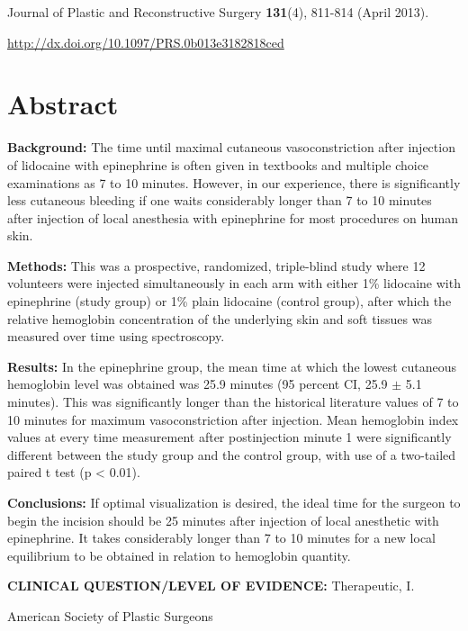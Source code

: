 \noindent Journal of Plastic and Reconstructive Surgery \textbf{131}(4), 811-814 (April 2013).

\noindent \url{http://dx.doi.org/10.1097/PRS.0b013e3182818ced}

\section*{Abstract}

\textbf{Background:} The time until maximal cutaneous vasoconstriction after injection of lidocaine with epinephrine is often given in textbooks and multiple choice examinations as 7 to 10 minutes. However, in our experience, there is significantly less cutaneous bleeding if one waits considerably longer than 7 to 10 minutes after injection of local anesthesia with epinephrine for most procedures on human skin.

\textbf{Methods:} This was a prospective, randomized, triple-blind study where 12 volunteers were injected simultaneously in each arm with either 1\% lidocaine with epinephrine (study group) or 1\% plain lidocaine (control group), after which the relative hemoglobin concentration of the underlying skin and soft tissues was measured over time using spectroscopy.

\textbf{Results:} In the epinephrine group, the mean time at which the lowest cutaneous hemoglobin level was obtained was 25.9 minutes (95 percent CI, 25.9 $\pm$ 5.1 minutes). This was significantly longer than the historical literature values of 7 to 10 minutes for maximum vasoconstriction after injection. Mean hemoglobin index values at every time measurement after postinjection minute 1 were significantly different between the study group and the control group, with use of a two-tailed paired t test (p < 0.01).

\textbf{Conclusions:} If optimal visualization is desired, the ideal time for the surgeon to begin the incision should be 25 minutes after injection of local anesthetic with epinephrine. It takes considerably longer than 7 to 10 minutes for a new local equilibrium to be obtained in relation to hemoglobin quantity.

\textbf{CLINICAL QUESTION/LEVEL OF EVIDENCE:} Therapeutic, I.

\noindent {} American Society of Plastic Surgeons

